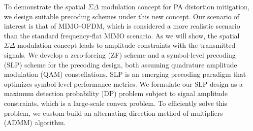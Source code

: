 \documentclass[10pt,twocolumn,twoside]{IEEEtran}
\begin{document}
To demonstrate the spatial $\Sigma \Delta$ modulation concept for PA distortion mitigation, we design suitable precoding schemes under this new concept.
Our scenario of interest is that of MIMO-OFDM, which is considered a more realistic scenario than the standard frequency-flat MIMO scenario.
As we will show, the spatial $\Sigma \Delta$ modulation concept leads to amplitude constraints with the transmitted signals.
We develop a zero-forcing (ZF) scheme and a symbol-level precoding (SLP) scheme for the precoding design, both assuming quadrature amplitude modulation (QAM) constellations.
SLP is an emerging precoding paradigm that optimizes symbol-level performance metrics. We formulate our SLP design as a maximum detection probability (DP) problem subject to signal amplitude constraints, which is a large-scale convex problem. To efficiently solve this problem, we custom build an alternating direction method of multipliers (ADMM) algorithm.
\end{document}
